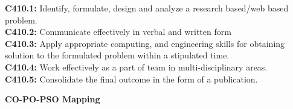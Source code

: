 \providecommand{\normal}{\fontsize{12pt}{16pt}\selectfont}
\providecommand{\size}{\fontsize{14pt}{18pt}\selectfont}
\providecommand{\bigsize}{\fontsize{16pt}{20pt}\selectfont}
\providecommand{\bigbigsize}{\fontsize{20pt}{24pt}\selectfont}
\begin{flushleft}
\textbf{\size{Course Outcomes(COs)}}
\end{flushleft}

\noindent\textbf{C410.1:} Identify, formulate, design and analyze a research based/web based problem.\\ 
\textbf{C410.2:} Communicate effectively in verbal and written form\\ 
\textbf{C410.3:} Apply appropriate computing, and engineering skills for obtaining solution to  the formulated problem within a stipulated time.\\
\textbf{C410.4:} Work effectively as a part of team in multi-disciplinary areas.\\ 
\textbf{C410.5:} Consolidate the final outcome in the form of a publication.

\vspace{5mm}
\begin{flushleft}
\size\textbf{CO-PO-PSO Mapping}
\end{flushleft}
\renewcommand{\arraystretch}{2}

